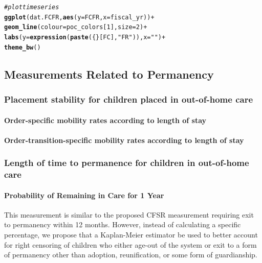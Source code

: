 \documentclass[12pt]{article}\usepackage[]{graphicx}\usepackage[]{color}
\makeatletter
\newcommand{\hlnum}[1]{\textcolor[rgb]{0.686,0.059,0.569}{#1}}%
\newcommand{\hlstr}[1]{\textcolor[rgb]{0.192,0.494,0.8}{#1}}%
\newcommand{\hlcom}[1]{\textcolor[rgb]{0.678,0.584,0.686}{\textit{#1}}}%
\newcommand{\hlopt}[1]{\textcolor[rgb]{0,0,0}{#1}}%
\newcommand{\hlstd}[1]{\textcolor[rgb]{0.345,0.345,0.345}{#1}}%
\newcommand{\hlkwc}[1]{\textcolor[rgb]{0.333,0.667,0.333}{#1}}%
\newcommand{\hlkwd}[1]{\textcolor[rgb]{0.737,0.353,0.396}{\textbf{#1}}}%
\newenvironment{kframe}{%
 \def\at@end@of@kframe{}%
 \ifinner\ifhmode%
  \def\at@end@of@kframe{\end{minipage}}%
  \begin{minipage}{\columnwidth}%
 \fi\fi%
 \def\FrameCommand##1{\hskip\@totalleftmargin \hskip-\fboxsep
 \colorbox{shadecolor}{##1}\hskip-\fboxsep
     \hskip-\linewidth \hskip-\@totalleftmargin \hskip\columnwidth}%
 \MakeFramed {\advance\hsize-\width
   \@totalleftmargin\z@ \linewidth\hsize
   \@setminipage}}%
 {\par\unskip\endMakeFramed%
 \at@end@of@kframe}
\newenvironment{knitrout}{}{} %
\makeatother
\begin{document}
\begin{knitrout}
\begin{kframe}
\begin{alltt}
\hlcom{#plot time series}
\hlkwd{ggplot}\hlstd{(dat.FCFR,} \hlkwd{aes}\hlstd{(}\hlkwc{y}\hlstd{=FCFR,} \hlkwc{x}\hlstd{=fiscal_yr))} \hlopt{+}
  \hlkwd{geom_line}\hlstd{(}\hlkwc{colour}\hlstd{=poc_colors[}\hlnum{1}\hlstd{],} \hlkwc{size}\hlstd{=}\hlnum{2}\hlstd{)} \hlopt{+}
  \hlkwd{labs}\hlstd{(}\hlkwc{y} \hlstd{=} \hlkwd{expression}\hlstd{(}\hlkwd{paste}\hlstd{(\{\}[FC],} \hlstr{"FR"}\hlstd{)),} \hlkwc{x} \hlstd{=} \hlstr{""}\hlstd{)} \hlopt{+}
  \hlkwd{theme_bw}\hlstd{()}
\end{alltt}


{\ttfamily\noindent\bfseries\color{errorcolor}{\#\# Error: ggplot2 doesn't know how to deal with data of class character}}\end{kframe}
\end{knitrout}



\subsection{Measurements Related to Permanency}

\subsubsection{Placement stability for children placed in out-of-home care}

\paragraph{Order-specific mobility rates according to length of stay}

\paragraph{Order-transition-specific mobility rates according to length of stay}

\subsubsection{Length of time to permanence for children in out-of-home care}

\paragraph{Probability of Remaining in Care for 1 Year} This measurement is similar to the proposed CFSR measurement requiring exit to permanency within 12 months. However, instead of calculating a specific percentage, we propose that a Kaplan-Meier estimator be used to better account for right censoring of children who either age-out of the system or exit to a form of permanency other than adoption, reunification, or some form of guardianship. 
 
\end{document}
